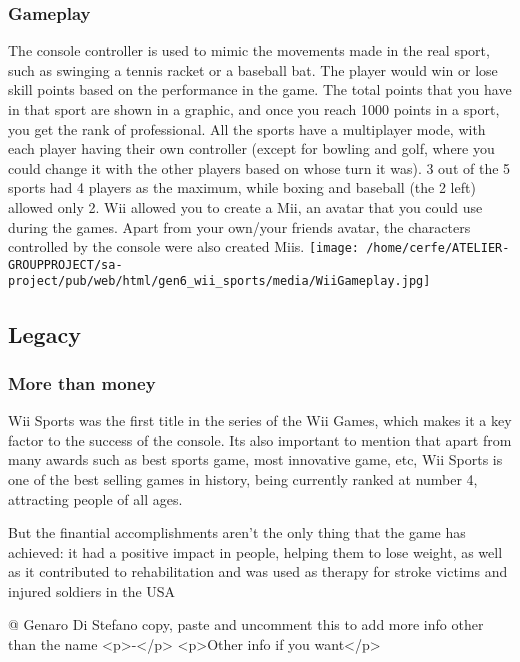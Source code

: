 \documentclass[a4paper,10pt]{book}
\begin{document}
 
 \subsubsection{Gameplay }
 
          The console controller is used to mimic the movements made in the real sport, such as swinging a tennis racket or a baseball bat. The player would win or lose skill points based on the performance in the game. The total points that you have in that sport are shown in a graphic, and once you reach 1000 points in a sport, you get the rank of professional.
All the sports have a multiplayer mode, with each player having their own controller (except for bowling and golf, where you could change it with the other players based on whose turn it was). 3 out of the 5 sports had 4 players as the maximum, while boxing and baseball (the 2 left) allowed only 2.  
          Wii allowed you to create a Mii, an avatar that you could use during the games. Apart from your own/your friends avatar, the characters controlled by the console were also created Miis.
          \texttt{[image: /home/cerfe/ATELIER-GROUPPROJECT/sa-project/pub/web/html/gen6\_wii\_sports/media/WiiGameplay.jpg]}
   
 \subsection{Legacy }
 \subsubsection{More than money }
 
           Wii Sports was the first title in the series of the Wii Games, which makes it a key factor to the success of the console. Its also important to mention that apart from many awards such as best sports game, most innovative game, etc, Wii Sports is one of the best selling games in history, being currently ranked at number 4, attracting people of all ages.
         
        But the finantial accomplishments aren't the only thing that the game has achieved: it had a positive impact in people, helping them to lose weight, as well as it contributed to rehabilitation and was used as therapy for stroke victims and injured soldiers in the USA
         
 
 
 
 
 @ Genaro Di Stefano 
  copy, paste and uncomment this to add more info other than the name
            <p>-</p>
            <p>Other info if you want</p>
           
\end{document}
